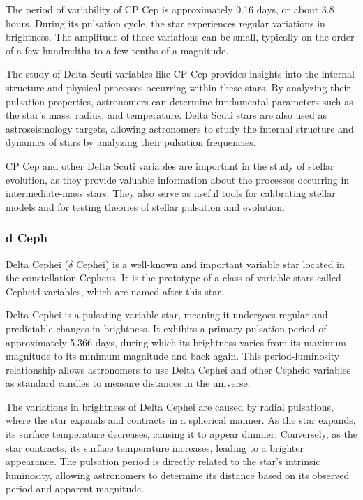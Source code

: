 The period of variability of CP Cep is approximately 0.16 days, or about 3.8 hours. During its pulsation cycle, the star experiences regular variations in brightness. The amplitude of these variations can be small, typically on the order of a few hundredths to a few tenths of a magnitude.

The study of Delta Scuti variables like CP Cep provides insights into the internal structure and physical processes occurring within these stars. By analyzing their pulsation properties, astronomers can determine fundamental parameters such as the star's mass, radius, and temperature. Delta Scuti stars are also used as astroseismology targets, allowing astronomers to study the internal structure and dynamics of stars by analyzing their pulsation frequencies.

CP Cep and other Delta Scuti variables are important in the study of stellar evolution, as they provide valuable information about the processes occurring in intermediate-mass stars. They also serve as useful tools for calibrating stellar models and for testing theories of stellar pulsation and evolution.


\subsubsection*{ d Ceph }
Delta Cephei ($\delta$ Cephei) is a well-known and important variable star located in the constellation Cepheus. It is the prototype of a class of variable stars called Cepheid variables, which are named after this star.

Delta Cephei is a pulsating variable star, meaning it undergoes regular and predictable changes in brightness. It exhibits a primary pulsation period of approximately 5.366 days, during which its brightness varies from its maximum magnitude to its minimum magnitude and back again. This period-luminosity relationship allows astronomers to use Delta Cephei and other Cepheid variables as standard candles to measure distances in the universe.

The variations in brightness of Delta Cephei are caused by radial pulsations, where the star expands and contracts in a spherical manner. As the star expands, its surface temperature decreases, causing it to appear dimmer. Conversely, as the star contracts, its surface temperature increases, leading to a brighter appearance. The pulsation period is directly related to the star's intrinsic luminosity, allowing astronomers to determine its distance based on its observed period and apparent magnitude.

